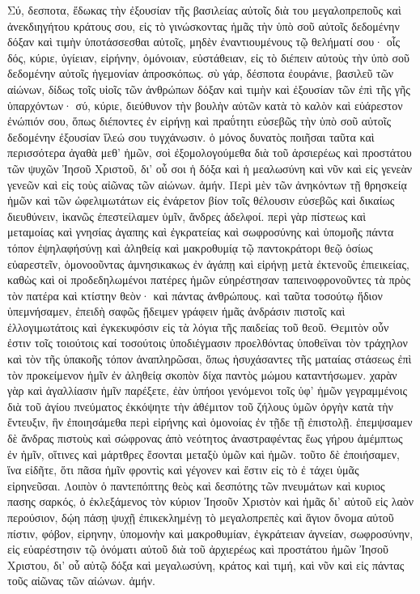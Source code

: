 Σύ, δεσποτα, ἔδωκας τὴν ἐξουσίαν τῆς βασιλείας αὐτοῖς διὰ του μεγαλοπρεποῦς καὶ ἀνεκδιηγήτου κράτους σου, εἰς τὸ γινώσκοντας ἡμᾶς τὴν ὑπὸ σοῦ αὐτοῖς δεδομένην δόξαν καὶ τιμὴν ὑποτάσσεσθαι αὐτοῖς, μηδὲν ἐναντιουμένους τῷ θελήματί σου· οἷς δός, κύριε, ὑγίειαν, εἰρήνην, ὁμόνοιαν, εὐστάθειαν, εἰς τὸ διέπειν αὐτοὺς τὴν ὑπὸ σοῦ δεδομένην αὐτοῖς ἡγεμονίαν ἀπροσκόπως. σὺ γάρ, δέσποτα ἐουράνιε, βασιλεῦ τῶν αἰώνων, δίδως τοῖς υἱοῖς τῶν ἀνθρώπων δόξαν καὶ τιμὴν καὶ ἐξουσίαν τῶν ἐπὶ τῆς γῆς ὑπαρχόντων· σύ, κύριε, διεύθυνον τὴν βουλὴν αὐτῶν κατὰ τὸ καλὸν καὶ εὐάρεστον ἐνώπιόν σου, ὅπως διέποντες ἐν εἰρήνῃ καὶ πραΰτητι εὐσεβῶς τὴν ὑπὸ σοῦ αὐτοῖς δεδομένην ἐξουσίαν ἵλεώ σου τυγχάνωσιν. ὁ μόνος δυνατὸς ποιῆσαι ταῦτα καὶ περισσότερα ἀγαθὰ μεθ’ ἡμῶν, σοὶ ἐξομολογούμεθα διὰ τοῦ ἀρσιερέως καὶ προστάτου τῶν ψυχῶν Ἰησοῦ Χριστοῦ, δι’ οὗ σοι ἡ δόξα καὶ ἡ μεαλωσύνη καὶ νῦν καὶ εἰς γενεὰν γενεῶν καὶ εἰς τοὺς αἰῶνας τῶν αἰώνων. ἀμήν.
Περὶ μὲν τῶν ἀνηκόντων τῇ θρησκείᾳ ἡμῶν καὶ τῶν ὠφελιμωτάτων εἰς ἐνάρετον βίον τοῖς θέλουσιν εὐσεβῶς καὶ δικαίως διευθύνειν, ἱκανῶς ἐπεστείλαμεν ὑμῖν, ἄνδρες ἀδελφοί. περὶ γὰρ πίστεως καὶ μεταμοίας καὶ γνησίας ἀγαπης καὶ ἐγκρατείας καὶ σωφροσύνης καὶ ὑπομοῆς πάντα τόπον ἐψηλαφήσύνῃ καὶ ἀληθείᾳ καὶ μακροθυμίᾳ τῷ παντοκράτορι θεῷ ὁσίως εὐαρεστεῖν, ὁμονοοῦντας ἀμνησικακως ἐν ἀγάπῃ καὶ εἰρήνῃ μετὰ ἐκτενοῦς ἐπιεικείας, καθὼς καὶ οἱ προδεδηλωμένοι πατέρες ἡμῶν εὐηρέστησαν ταπεινοφρονοῦντες τὰ πρὸς τὸν πατέρα καὶ κτίστην θεὸν· καὶ πάντας ἀνθρώπους. καὶ ταῦτα τοσούτῳ ἥδιον ὑπεμνήσαμεν, ἐπειδὴ σαφῶς ᾔδειμεν γράφειν ἡμᾶς ἀνδράσιν πιστοῖς καὶ ἐλλογιμωτάτοις καὶ ἐγκεκυφόσιν εἰς τὰ λόγια τῆς παιδείας τοῦ θεοῦ.
Θεμιτὸν οὖν ἐστιν τοῖς τοιούτοις καί τοσούτοις ὑποδιέγμασιν προελθόντας ὑποθεϊναι τὸν τράχηλον καὶ τὸν τῆς ὑπακοῆς τόπον ἀναπληρῶσαι, ὅπως ἡσυχάσαντες τῆς ματαίας στάσεως ἐπὶ τὸν προκείμενον ἡμῖν ἐν ἀληθείᾳ σκοπὸν δίχα παντὸς μώμου καταντήσωμεν. χαρὰν γὰρ καὶ ἀγαλλίασιν ἡμῖν παρέξετε, ἐὰν ὑπήοοι γενόμενοι τοῖς ὑφ’ ἡμῶν γεγραμμένοις διὰ τοῦ ἁγίου πνεύματος ἐκκόψητε τὴν ἀθέμιτον τοῦ ζήλους ὑμῶν ὀργὴν κατὰ τὴν ἔντευξιν, ἣν ἐποιησάμεθα περὶ εἰρήνης καὶ ὁμονοίας ἐν τῇδε τῇ ἐπιστολῇ. ἐπεμψσαμεν δὲ ἄνδρας πιστοὺς καὶ σώφρονας ἀπὸ νεότητος ἀναστραφέντας ἕως γήρου ἀμέμπτως ἐν ἡμῖν, οἵτινες καὶ μάρτθρες ἔσονται μεταξὺ ὑμῶν καὶ ἡμῶν. τοῦτο δὲ ἐποιήσαμεν, ἵνα εἰδῆτε, ὅτι πᾶσα ἡμῖν φροντὶς καὶ γέγονεν καὶ ἔστιν εἰς τὸ ἐ τάχει ὑμᾶς εἰρηνεῦσαι.
Λοιπὸν ὁ παντεπόπτης θεὸς καὶ δεσπότης τῶν πνευμάτων καὶ κυριος πασης σαρκός, ὁ ἐκλεξάμενος τὸν κύριον Ἰησοῦν Χριστὸν καὶ ἡμᾶς δι’ αὐτοῦ εἰς λαὸν περούσιον, δῴη πάσῃ ψυχῇ ἐπικεκλημένῃ τὸ μεγαλοπρεπὲς καὶ ἅγιον ὄνομα αὐτοῦ πίστιν, φόβον, εἰρηνην, ὑπομονὴν καὶ μακροθυμίαν, ἐγκράτειαν ἁγνείαν, σωφροσύνην, εἰς εὐαρέστησιν τῷ ὀνόματι αὐτοῦ διὰ τοῦ ἀρχιερέως καὶ προστάτου ἡμῶν Ἰησοῦ Χριστου, δι’ οὗ αὐτῷ δόξα καὶ μεγαλωσύνη, κράτος καὶ τιμή, καὶ νῦν καὶ εἰς πάντας τοῦς αἰῶνας τῶν αἰώνων. ἀμήν.
